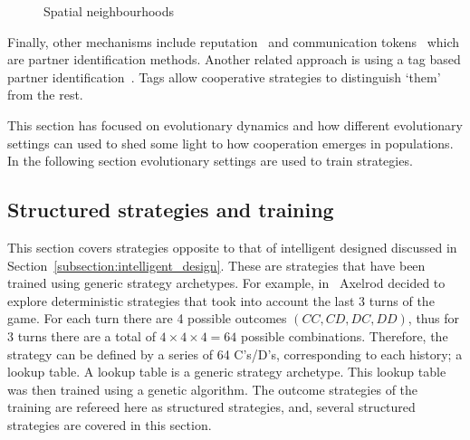 \documentclass{article}
\theoremstyle{definition}
\begin{document}
\begin{figure}[!hbtp]
\centering
    \begin{subfigure}{.25\textwidth}
        
    \end{subfigure}
    \begin{subfigure}{.25\textwidth}\centering
        
     \end{subfigure}
     \begin{subfigure}{.25\textwidth}\centering
        
     \end{subfigure}
     \caption{Spatial neighbourhoods}\label{fig:topologies}
    \end{figure}

Finally, other mechanisms include reputation~\cite{Janssen2006, Nowak1998, Suzuki2005}
and communication tokens~\cite{Miller2002} which are partner identification methods.
Another related approach is using a tag based partner identification~\cite{Choi2006,
Hales2000, Miller2002, Riolo2001}. Tags allow cooperative strategies to distinguish
`them' from the rest.

This section has focused on evolutionary dynamics and how different evolutionary
settings can used to shed some light to how cooperation emerges in populations.
In the following section evolutionary settings are used to train strategies.

\subsection{Structured strategies and training}
\label{section:structured_strategies}

This section covers strategies opposite to that of intelligent designed
discussed in Section~\ref{subsection:intelligent_design}. These are strategies
that have been trained using generic strategy archetypes. For example,
in~\cite{Axelrod1987} Axelrod decided to explore deterministic strategies that
took into account the last 3 turns of the game. For each turn there are 4
possible outcomes \((CC, CD, DC, DD)\), thus for 3 turns there are a total of
\(4\times4\times4=64\) possible combinations. Therefore, the strategy can be
defined by a series of 64 C's/D's, corresponding to each history; a lookup
table. A lookup table is a generic strategy archetype. This lookup table was
then trained using a genetic algorithm. The outcome strategies of the training
are refereed here as structured strategies, and, several structured strategies
are covered in this section.
\end{document}
